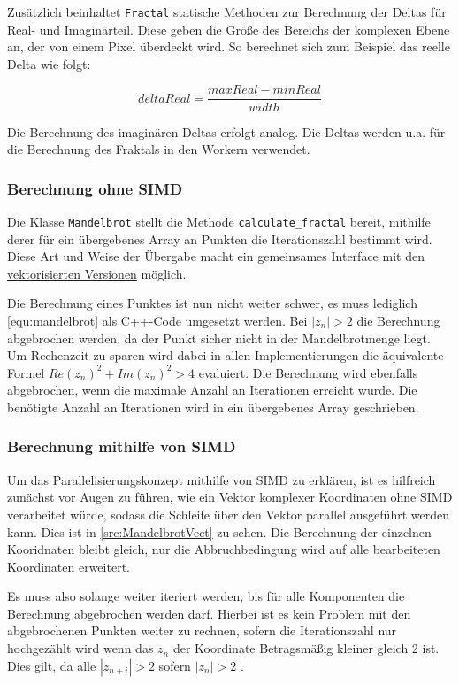 Zusätzlich beinhaltet \verb|Fractal| statische Methoden zur Berechnung der Deltas für Real- und Imaginärteil.
Diese geben die Größe des Bereichs der komplexen Ebene an, der von einem Pixel überdeckt wird.
So berechnet sich zum Beispiel das reelle Delta wie folgt:

\begin{equation*}
	deltaReal = \frac{maxReal - minReal}{width}
\end{equation*}

Die Berechnung des imaginären Deltas erfolgt analog.
Die Deltas werden u.a. für die Berechnung des Fraktals in den Workern verwendet.

\subsubsection{Berechnung ohne SIMD}

Die Klasse \verb|Mandelbrot| stellt die Methode \verb|calculate_fractal| bereit,
mithilfe derer für ein übergebenes Array an Punkten die Iterationszahl bestimmt wird.
Diese Art und Weise der Übergabe macht ein gemeinsames Interface mit den \hyperref[subsec:simd]{vektorisierten Versionen} möglich.

Die Berechnung eines Punktes ist nun nicht weiter schwer, es muss lediglich \autoref{equ:mandelbrot} als C++-Code umgesetzt werden.
Bei $|z_n| > 2$ die Berechnung abgebrochen werden, da der Punkt sicher nicht in der Mandelbrotmenge liegt.
Um Rechenzeit zu sparen wird dabei in allen Implementierungen die äquivalente Formel $Re(z_n)^2 + Im(z_n)^2 > 4$ evaluiert.
Die Berechnung wird ebenfalls abgebrochen, wenn die maximale Anzahl an Iterationen erreicht wurde.
Die benötigte Anzahl an Iterationen wird in ein übergebenes Array geschrieben.

\subsubsection{Berechnung mithilfe von SIMD}\label{subsec:simd}

Um das Parallelisierungskonzept mithilfe von SIMD zu erklären,
ist es hilfreich zunächst vor Augen zu führen, wie ein Vektor komplexer Koordinaten ohne SIMD verarbeitet würde,
sodass die Schleife über den Vektor parallel ausgeführt werden kann.
Dies ist in \autoref{src:MandelbrotVect} zu sehen.
Die Berechnung der einzelnen Kooridnaten bleibt gleich, nur die Abbruchbedingung wird auf alle bearbeiteten Koordinaten erweitert.

Es muss also solange weiter iteriert werden, bis für alle Komponenten die Berechnung abgebrochen werden darf.
Hierbei ist es kein Problem mit den abgebrochenen Punkten weiter zu rechnen, sofern die
Iterationszahl nur hochgezählt wird wenn das $z_n$ der Koordinate Betragsmäßig kleiner gleich $2$ ist.
Dies gilt, da alle $|z_{n+i}| > 2$ sofern $|z_n| > 2$ \cite{424331}.

